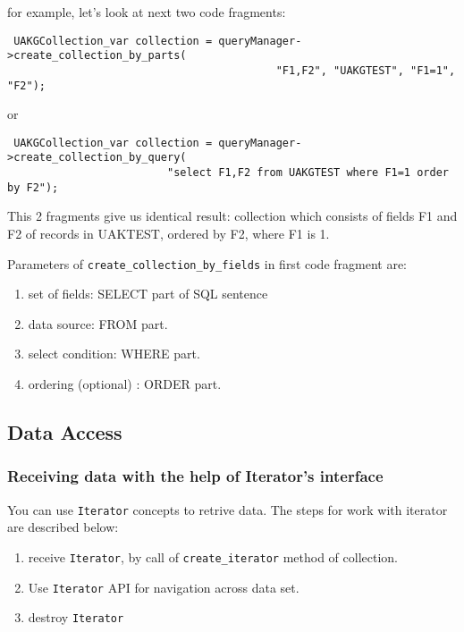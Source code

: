for example, let's look at next two code fragments:

\begin{verbatim}
 UAKGCollection_var collection = queryManager->create_collection_by_parts(
                                          "F1,F2", "UAKGTEST", "F1=1", "F2");
\end{verbatim}

or

\begin{verbatim}
 UAKGCollection_var collection = queryManager->create_collection_by_query(
                         "select F1,F2 from UAKGTEST where F1=1 order by F2");
\end{verbatim}

 This 2 fragments give us identical result: collection which consists 
 of fields F1 and F2 of records in UAKTEST, ordered by F2, where F1 is 1.
 
 Parameters of \verb|create_collection_by_fields| in first code fragment are:

 \begin{enumerate}
   \item set of fields: SELECT part of SQL sentence
   \item data source: FROM part.
   \item select condition: WHERE part.
   \item ordering (optional) : ORDER part.
 \end{enumerate}

\subsection{ Data Access }

\subsubsection{ Receiving data with the help of Iterator's interface }

 You can use \verb|Iterator| concepts to retrive data.
 The steps for work with iterator are described below:

 \begin{enumerate}
  \item receive \verb|Iterator|, by call of \verb|create_iterator| method of collection.
  \item Use \verb|Iterator| API for navigation across data set.
  \item destroy \verb|Iterator|
 \end{enumerate}

